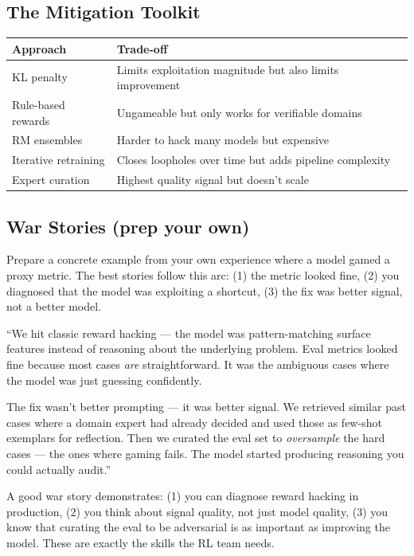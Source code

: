 \subsection{The Mitigation Toolkit}

\begin{tabular}{@{}p{2.8cm}p{4.5cm}@{}}
\toprule
\textbf{Approach} & \textbf{Trade-off} \\
\midrule
KL penalty & Limits exploitation magnitude but also limits improvement \\
Rule-based rewards & Ungameable but only works for verifiable domains \\
RM ensembles & Harder to hack many models but expensive \\
Iterative retraining & Closes loopholes over time but adds pipeline complexity \\
Expert curation & Highest quality signal but doesn't scale \\
\bottomrule
\end{tabular}

\subsection{War Stories (prep your own)}

Prepare a concrete example from your own experience where a model gamed a proxy metric. The best stories follow this arc: (1) the metric looked fine, (2) you diagnosed that the model was exploiting a shortcut, (3) the fix was better signal, not a better model.

\begin{sayit}
``We hit classic reward hacking --- the model was pattern-matching surface features instead of reasoning about the underlying problem. Eval metrics looked fine because most cases \textit{are} straightforward. It was the ambiguous cases where the model was just guessing confidently.

The fix wasn't better prompting --- it was better signal. We retrieved similar past cases where a domain expert had already decided and used those as few-shot exemplars for reflection. Then we curated the eval set to \textit{oversample} the hard cases --- the ones where gaming fails. The model started producing reasoning you could actually audit.''
\end{sayit}

\begin{whyanthro}
A good war story demonstrates: (1) you can diagnose reward hacking in production, (2) you think about signal quality, not just model quality, (3) you know that curating the eval to be adversarial is as important as improving the model. These are exactly the skills the RL team needs.
\end{whyanthro}

